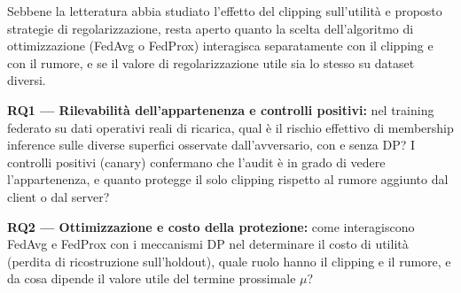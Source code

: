 
Sebbene la letteratura abbia studiato l'effetto del clipping sull'utilità e proposto
strategie di regolarizzazione, resta aperto quanto la scelta dell'algoritmo di
ottimizzazione (FedAvg o FedProx) interagisca separatamente con il clipping e con il rumore,
e se il valore di regolarizzazione utile sia lo stesso su dataset diversi.

\item \textbf{RQ1 --- Rilevabilità dell'appartenenza e controlli positivi:} nel training
federato su dati operativi reali di ricarica, qual è il rischio effettivo di membership
inference sulle diverse superfici osservate dall'avversario, con e senza DP? I controlli
positivi (canary) confermano che l'audit è in grado di vedere l'appartenenza, e quanto
protegge il solo clipping rispetto al rumore aggiunto dal client o dal server?

\item \textbf{RQ2 --- Ottimizzazione e costo della protezione:} come interagiscono FedAvg e
FedProx con i meccanismi DP nel determinare il costo di utilità (perdita di ricostruzione
sull'holdout), quale ruolo hanno il clipping e il rumore, e da cosa dipende il valore utile
del termine prossimale $\mu$?



